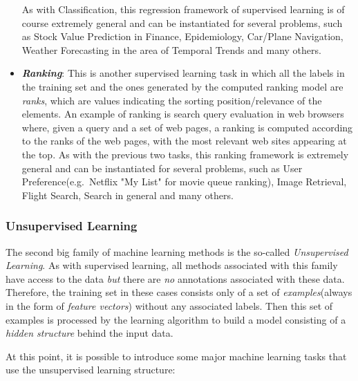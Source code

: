 \begin{itemize}
            As with Classification, this regression framework of
            supervised learning is of course extremely general
            and can be instantiated for several problems, such as
            Stock Value Prediction in Finance, Epidemiology, Car/Plane
            Navigation, Weather Forecasting in the area of Temporal
            Trends and many others.

      \item \emph{\textbf{Ranking}}: This is another supervised learning
            task in which all the labels in the training set and the ones
            generated by the computed ranking model are \emph{ranks},
            which are values indicating the sorting position/relevance
            of the elements. An example of ranking is search query
            evaluation in web browsers where, given a query and a set of
            web pages, a ranking is computed according to the ranks of
            the web pages, with the most relevant web sites appearing at
            the top. As with the previous two tasks, this ranking
            framework is extremely general and can be instantiated for
            several problems, such as User Preference(e.g.\ Netflix
            "My List" for movie queue ranking), Image Retrieval, Flight
            Search, Search in general and many others.
\end{itemize}

\newpage

\subsubsection{Unsupervised Learning}
The second big family of machine learning methods is the so-called
\emph{Unsupervised Learning}. As with supervised learning,
all methods associated with this family have access to the data
\emph{but} there are \emph{no} annotations associated with these data.
Therefore, the training set in these cases consists only of a set
of \emph{examples}(always in the form of \emph{feature vectors})
without any associated labels. Then this set of examples is processed
by the learning algorithm to build a model consisting of a
\emph{hidden structure} behind the input data.

At this point, it is possible to introduce some major machine learning
tasks that use the unsupervised learning structure:


